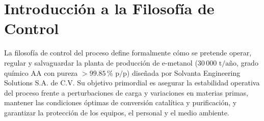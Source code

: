 \documentclass[10pt,letterpaper]{article}
\begin{document}
\section{Introducción a la Filosofía de Control}
La filosofía de control del proceso define formalmente cómo se pretende operar, regular y salvaguardar la planta de producción de e-metanol ($30\,000\text{ t/año}$, grado químico AA con pureza $>99.85\,\%\text{ p/p}$) diseñada por Solvanta Engineering Solutions S.A. de C.V. Su objetivo primordial es asegurar la estabilidad operativa del proceso frente a perturbaciones de carga y variaciones en materias primas, mantener las condiciones óptimas de conversión catalítica y purificación, y garantizar la protección de los equipos, el personal y el medio ambiente.
\end{document}
